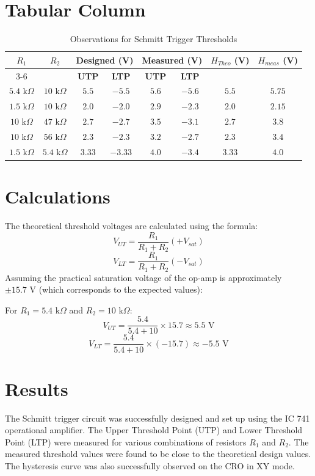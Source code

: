 \documentclass[12pt,a4paper]{article}
\begin{document}
\section{Tabular Column}
\begin{table}[H]
\centering
\begin{tabular}{|c|c|c|c|c|c|c|c|}
\hline
\textbf{$R_1$} & \textbf{$R_2$} & \multicolumn{2}{c|}{\textbf{Designed (V)}} & \multicolumn{2}{c|}{\textbf{Measured (V)}} & \textbf{$H_{Theo}$ (V)} & \textbf{$H_{meas}$ (V)} \\
\cline{3-6}
& & \textbf{UTP} & \textbf{LTP} & \textbf{UTP} & \textbf{LTP} & & \\
\hline
$5.4\text{ k}\Omega$ & $10\text{ k}\Omega$ & $5.5$ & $-5.5$ & $5.6$ & $-5.6$ & $5.5$ & $5.75$ \\
$1.5\text{ k}\Omega$ & $10\text{ k}\Omega$ & $2.0$ & $-2.0$ & $2.9$ & $-2.3$ & $2.0$ & $2.15$ \\
$10\text{ k}\Omega$ & $47\text{ k}\Omega$ & $2.7$ & $-2.7$ & $3.5$ & $-3.1$ & $2.7$ & $3.8$ \\
$10\text{ k}\Omega$ & $56\text{ k}\Omega$ & $2.3$ & $-2.3$ & $3.2$ & $-2.7$ & $2.3$ & $3.4$ \\
$1.5\text{ k}\Omega$ & $5.4\text{ k}\Omega$ & $3.33$ & $-3.33$ & $4.0$ & $-3.4$ & $3.33$ & $4.0$ \\
\hline
\end{tabular}
\caption{Observations for Schmitt Trigger Thresholds}
\end{table}

\section{Calculations}
The theoretical threshold voltages are calculated using the formula:
$$ V_{UT} = \frac{R_1}{R_1 + R_2} (+V_{sat}) $$
$$ V_{LT} = \frac{R_1}{R_1 + R_2} (-V_{sat}) $$
Assuming the practical saturation voltage of the op-amp is approximately $\pm 15.7\text{ V}$ (which corresponds to the expected values):

For $R_1 = 5.4\text{ k}\Omega$ and $R_2 = 10\text{ k}\Omega$:
$$ V_{UT} = \frac{5.4}{5.4 + 10} \times 15.7 \approx 5.5\text{ V} $$
$$ V_{LT} = \frac{5.4}{5.4 + 10} \times (-15.7) \approx -5.5\text{ V} $$

\section{Results}
The Schmitt trigger circuit was successfully designed and set up using the IC 741 operational amplifier. The Upper Threshold Point (UTP) and Lower Threshold Point (LTP) were measured for various combinations of resistors $R_1$ and $R_2$. The measured threshold values were found to be close to the theoretical design values. The hysteresis curve was also successfully observed on the CRO in XY mode.
\end{document}
